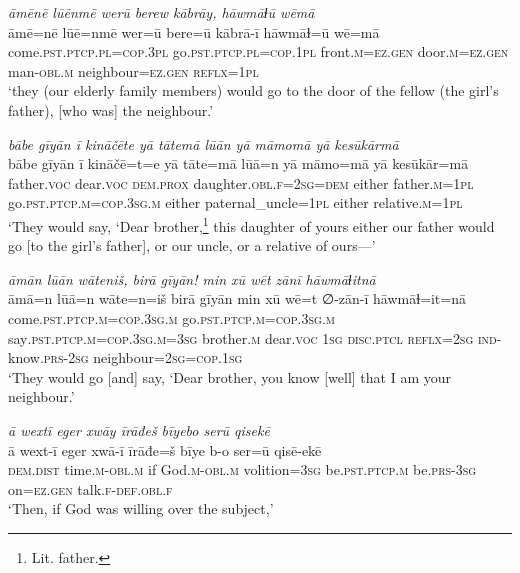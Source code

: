 \ea \label{RE.3}
\textit{āmēnē lūēnmē werū berew kābrāy, hāwmāɫū wēmā} \\ 
\gll āmē=nē lūē=nmē wer=ū bere=ū kābrā-ī hāwmāɫ=ū wē=mā \\ 
 come\textsc{.pst}\textsc{.ptcp}\textsc{.pl}\textsc{=cop}\textsc{.3pl} go\textsc{.pst}\textsc{.ptcp}\textsc{.pl}\textsc{=cop}\textsc{.\textsc{1pl}} front\textsc{.m}\textsc{\textsc{=ez.gen}} door\textsc{.m}\textsc{\textsc{=ez.gen}} man\textsc{-obl}\textsc{.m} neighbour\textsc{\textsc{=ez.gen}} \textsc{reflx}\textsc{=\textsc{1pl}} \\ 
\glt `they (our elderly family members) would go to the door of the fellow (the girl’s father), [who was] the neighbour.'
\z 
 
\ea \label{RE.4}
\textit{bābe gīyān ī kināčēte yā tātemā lūān yā māmomā yā kesūkārmā} \\ 
\gll bābe gīyān ī kināčē=t=e yā tāte=mā lūā=n yā māmo=mā yā kesūkār=mā \\ 
 father.\textsc{voc} dear.\textsc{voc} \textsc{dem.prox} daughter\textsc{.obl}\textsc{.f}\textsc{=\textsc{2sg}}\textsc{=dem} either father\textsc{.m}\textsc{=\textsc{1pl}} go\textsc{.pst}\textsc{.ptcp}\textsc{.m}\textsc{=cop}\textsc{.3sg}\textsc{.m} either paternal\_uncle\textsc{=\textsc{1pl}} either relative\textsc{.m}\textsc{=\textsc{1pl}} \\ 
\glt `They would say, ‘Dear brother,\footnote{Lit. father.} this daughter of yours \—either our father would go [to the girl’s father], or our uncle, or a relative of ours—'
\z 
 
\ea \label{RE.5}
\textit{āmān lūān wāteniš, birā gīyān! min xū wēt zānī hāwmāɫitnā} \\ 
\gll āmā=n lūā=n wāte=n=iš birā gīyān min xū wē=t ∅-zān-ī hāwmāɫ=it=nā \\ 
 come\textsc{.pst}\textsc{.ptcp}\textsc{.m}\textsc{=cop}\textsc{.3sg}\textsc{.m} go\textsc{.pst}\textsc{.ptcp}\textsc{.m}\textsc{=cop}\textsc{.3sg}\textsc{.m} say\textsc{.pst}\textsc{.ptcp}\textsc{.m}\textsc{=cop}\textsc{.3sg}\textsc{.m}\textsc{=3sg} brother\textsc{.m} dear.\textsc{voc} \textsc{1sg} \textsc{disc.ptcl} \textsc{reflx}\textsc{=\textsc{2sg}} \textsc{ind-}know\textsc{.prs}-\textsc{2sg} neighbour\textsc{=\textsc{2sg}}\textsc{=cop}\textsc{.\textsc{1sg}} \\ 
\glt `They would go [and] say, ‘Dear brother, you know [well] that I am your neighbour.'
\z 
 
\ea \label{RE.8}
\textit{ā wextī eger xwāy īrāđeš bīyebo serū qisekē} \\ 
\gll ā wext-ī eger xwā-ī īrāđe=š bīye b-o ser=ū qisē-ekē \\ 
 \textsc{dem.dist} time\textsc{.m}\textsc{-obl}\textsc{.m} if God\textsc{.m}\textsc{-obl}\textsc{.m} volition\textsc{=3sg} be\textsc{.pst}\textsc{.ptcp}\textsc{.m} be\textsc{.prs}\textsc{-3sg} on\textsc{\textsc{=ez.gen}} talk\textsc{.f}\textsc{-def}\textsc{.obl}\textsc{.f} \\ 
\glt `Then, if God was willing over the subject,'
\z 
 
